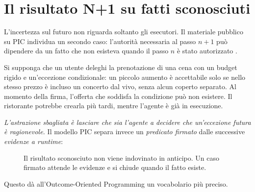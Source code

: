 \documentclass[10pt,oneside,openany]{book}
\begin{document}
\chapter{Il risultato N+1 su fatti sconosciuti}

L'incertezza sul futuro non riguarda soltanto gli esecutori. Il materiale pubblico su PIC individua un secondo caso: l'autorità necessaria al passo $n+1$ può dipendere da un fatto che non esisteva quando il passo $n$ è stato autorizzato \cite{picwhy}.

Si supponga che un utente deleghi la prenotazione di una cena con un budget rigido e un'eccezione condizionale: un piccolo aumento è accettabile solo se nello stesso prezzo è incluso un concerto dal vivo, senza alcun coperto separato. Al momento della firma, l'offerta che soddisfa la condizione può non esistere. Il ristorante potrebbe crearla più tardi, mentre l'agente è già in esecuzione.

\emph{L'astrazione sbagliata è lasciare che sia l'agente a decidere che un'eccezione futura è ragionevole.} Il modello PIC separa invece un \emph{predicato firmato} dalle successive \emph{evidenze a runtime}:

\begin{figure}[ht]
\centering
{}
\caption{Il risultato sconosciuto non viene indovinato in anticipo. Un caso firmato attende le evidenze e si chiude quando il fatto esiste.}
\end{figure}

Questo dà all'Outcome-Oriented Programming un vocabolario più preciso.
\end{document}
